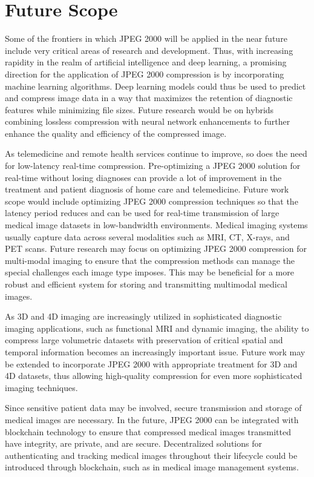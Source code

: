 \documentclass[conference,letterpaper]{IEEEtran}
\begin{document}
\section{Future Scope}

Some of the frontiers in which JPEG 2000 will be applied in the near future include very critical areas of research and development. Thus, with increasing rapidity in the realm of artificial intelligence and deep learning, a promising direction for the application of JPEG 2000 compression is by incorporating machine learning algorithms. Deep learning models could thus be used to predict and compress image data in a way that maximizes the retention of diagnostic features while minimizing file sizes. Future research would be on hybrids combining lossless compression with neural network enhancements to further enhance the quality and efficiency of the compressed image.

As telemedicine and remote health services continue to improve, so does the need for low-latency real-time compression. Pre-optimizing a JPEG 2000 solution for real-time without losing diagnoses can provide a lot of improvement in the treatment and patient diagnosis of home care and telemedicine. Future work scope would include optimizing JPEG 2000 compression techniques so that the latency period reduces and can be used for real-time transmission of large medical image datasets in low-bandwidth environments. Medical imaging systems usually capture data across several modalities such as MRI, CT, X-rays, and PET scans.  Future research may focus on optimizing JPEG 2000 compression for multi-modal imaging to ensure that the compression methods can manage the special challenges each image type imposes. This may be beneficial for a more robust and efficient system for storing and transmitting multimodal medical images.

As 3D and 4D imaging are increasingly utilized in sophisticated diagnostic imaging applications, such as functional MRI and dynamic imaging, the ability to compress large volumetric datasets with preservation of critical spatial and temporal information becomes an increasingly important issue. Future work may be extended to incorporate JPEG 2000 with appropriate treatment for 3D and 4D datasets, thus allowing high-quality compression for even more sophisticated imaging techniques. 

Since sensitive patient data may be involved, secure transmission and storage of medical images are necessary. In the future, JPEG 2000 can be integrated with blockchain technology to ensure that compressed medical images transmitted have integrity, are private, and are secure. Decentralized solutions for authenticating and tracking medical images throughout their lifecycle could be introduced through blockchain, such as in medical image management systems.
\end{document}
